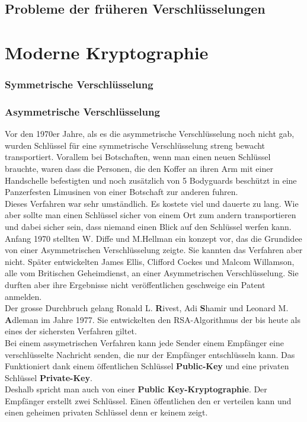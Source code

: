\subsection{Probleme der früheren Verschlüsselungen}




\section{Moderne Kryptographie}

\subsubsection{Symmetrische Verschlüsselung}
\subsubsection{Asymmetrische Verschlüsselung}
Vor den 1970er Jahre, als es die asymmetrische Verschlüsselung noch nicht gab, wurden Schlüssel für eine symmetrische Verschlüsselung streng bewacht transportiert.
Vorallem bei Botschaften, wenn man einen neuen Schlüssel brauchte, waren dass die Personen, die den Koffer an ihren Arm mit einer Handschelle befestigten und noch zusätzlich von 5 Bodyguards beschützt in eine Panzerfesten Limusinen von einer Botschaft zur anderen fuhren.\\
Dieses Verfahren war sehr umständlich. Es kostete viel und dauerte zu lang. Wie aber sollte man einen Schlüssel sicher von einem Ort zum andern transportieren und dabei sicher sein, dass niemand einen Blick auf den Schlüssel werfen kann.\\
Anfang 1970 stellten W. Diffe und M.Hellman ein konzept vor, das die Grundidee von einer Asymmetrischen Verschlüsselung zeigte. Sie kannten das Verfahren aber nicht.
Später entwickelten James Ellis, Clifford Cockes und Malcom Willamson, alle vom Britischen Geheimdienst, an einer Asymmetrischen Verschlüsselung. Sie durften aber ihre Ergebnisse nicht veröffentlichen geschweige ein Patent anmelden.\\
Der grosse Durchbruch gelang Ronald L. \textbf{R}ivest, Adi \textbf{S}hamir und Leonard M. \textbf{A}dleman im Jahre 1977. Sie entwickelten den RSA-Algorithmus der bis heute als eines der sichersten Verfahren giltet.\\[2ex]
%
Bei einem assymetrischen Verfahren kann jede Sender einem Empfänger eine verschlüsselte Nachricht senden, die nur der Empfänger entschlüsseln kann. Das Funktioniert dank einem öffentlichen Schlüssel \textbf{Public-Key} und eine privaten Schlüssel \textbf{Private-Key}. \\
Deshalb spricht man auch von einer  \textbf{Public Key-Kryptographie}.
Der Empfänger erstellt zwei Schlüssel. Einen öffentlichen den er verteilen kann und einen geheimen privaten Schlüssel denn er keinem zeigt. 

